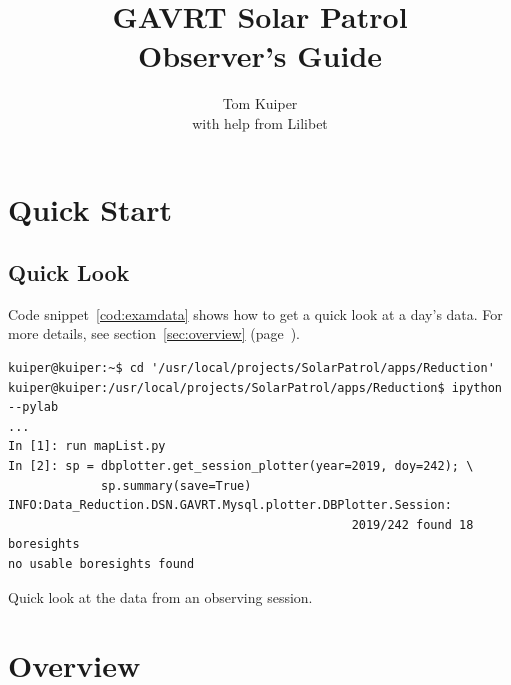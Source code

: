 \documentclass[letterpaper,11pt]{report}
\title{GAVRT Solar Patrol\\Observer's Guide}
\author{Tom Kuiper\\with help from Lilibet}
\begin{document}
\maketitle
\tableofcontents
\listoffigures
\listoftables
{}

\chapter{Quick Start}

\section{Quick Look}

Code snippet~\ref{cod:examdata} shows how to get a quick look at a day's data.
For more details, see section~\ref{sec:overview} (page~\pageref{sec:overview}).
\begin{code}[h!tb]
    \begin{center}
        {\footnotesize \begin{verbatim}
kuiper@kuiper:~$ cd '/usr/local/projects/SolarPatrol/apps/Reduction'
kuiper@kuiper:/usr/local/projects/SolarPatrol/apps/Reduction$ ipython --pylab
...
In [1]: run mapList.py
In [2]: sp = dbplotter.get_session_plotter(year=2019, doy=242); \
             sp.summary(save=True)
INFO:Data_Reduction.DSN.GAVRT.Mysql.plotter.DBPlotter.Session:
                                                2019/242 found 18 boresights
no usable boresights found\end{verbatim}
        }\caption{\label{cod:examdata}Quick look at the data from an observing
        session.}
    \end{center}
\end{code}



\chapter{Overview}
\end{document}

